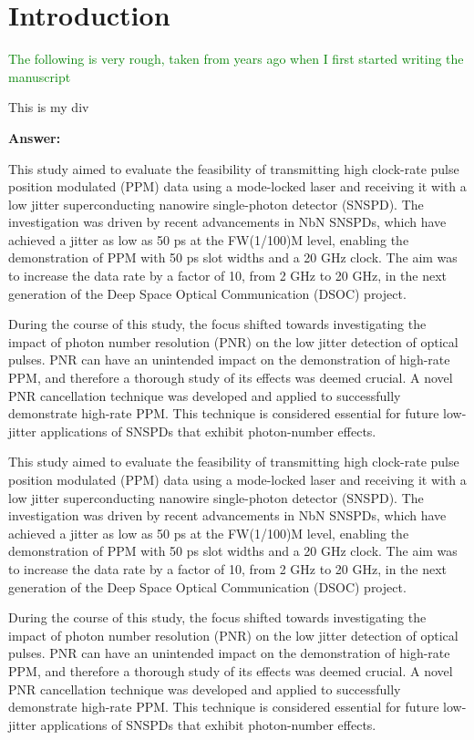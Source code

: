 \documentclass[11pt]{caltech_thesis} %
\begin{document}
\hypertarget{introduction-2}{%
\section{Introduction}\label{introduction-2}}

\textcolor{green}{ The following is very rough, taken from years ago
when I first started writing the manuscript }

This is my div

{\color{midnightblue}  \textbf{Answer:} }

This study aimed to evaluate the feasibility of transmitting high
clock-rate pulse position modulated (PPM) data using a mode-locked laser
and receiving it with a low jitter superconducting nanowire
single-photon detector (SNSPD). The investigation was driven by recent
advancements in NbN SNSPDs, which have achieved a jitter as low as 50 ps
at the FW(1/100)M level, enabling the demonstration of PPM with 50 ps
slot widths and a 20 GHz clock. The aim was to increase the data rate by
a factor of 10, from 2 GHz to 20 GHz, in the next generation of the Deep
Space Optical Communication (DSOC) project.

During the course of this study, the focus shifted towards investigating
the impact of photon number resolution (PNR) on the low jitter detection
of optical pulses. PNR can have an unintended impact on the
demonstration of high-rate PPM, and therefore a thorough study of its
effects was deemed crucial. A novel PNR cancellation technique was
developed and applied to successfully demonstrate high-rate PPM. This
technique is considered essential for future low-jitter applications of
SNSPDs that exhibit photon-number effects.

This study aimed to evaluate the feasibility of transmitting high
clock-rate pulse position modulated (PPM) data using a mode-locked laser
and receiving it with a low jitter superconducting nanowire
single-photon detector (SNSPD). The investigation was driven by recent
advancements in NbN SNSPDs, which have achieved a jitter as low as 50 ps
at the FW(1/100)M level, enabling the demonstration of PPM with 50 ps
slot widths and a 20 GHz clock. The aim was to increase the data rate by
a factor of 10, from 2 GHz to 20 GHz, in the next generation of the Deep
Space Optical Communication (DSOC) project.

During the course of this study, the focus shifted towards investigating
the impact of photon number resolution (PNR) on the low jitter detection
of optical pulses. PNR can have an unintended impact on the
demonstration of high-rate PPM, and therefore a thorough study of its
effects was deemed crucial. A novel PNR cancellation technique was
developed and applied to successfully demonstrate high-rate PPM. This
technique is considered essential for future low-jitter applications of
SNSPDs that exhibit photon-number effects.
\end{document}
